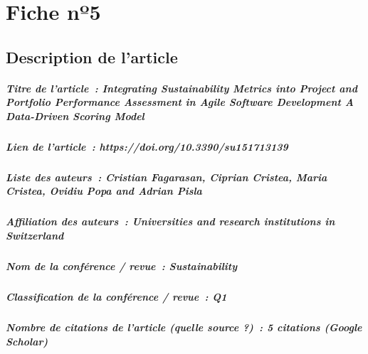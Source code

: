 
\chapter{Fiche nº5} %
\label{app:Fiche5} %

\section{Description de l'article}

\paragraph{Titre de l'article~: \textnormal{Integrating Sustainability Metrics into Project and Portfolio Performance Assessment in Agile Software Development A Data-Driven Scoring Model}}
\paragraph{Lien de l'article~: \textnormal{https://doi.org/10.3390/su151713139}}
\paragraph{Liste des auteurs~: \textnormal{Cristian Fagarasan, Ciprian Cristea, Maria Cristea, Ovidiu Popa and Adrian Pisla}}
\paragraph{Affiliation des auteurs~: \textnormal{Universities and research institutions in Switzerland}}
\paragraph{Nom de la conférence / revue~: \textnormal{Sustainability}}
\paragraph{Classification de la conférence / revue~: \textnormal{Q1}}
\paragraph{Nombre de citations de l'article (quelle source ?)~: \textnormal{5 citations (Google Scholar)}}



